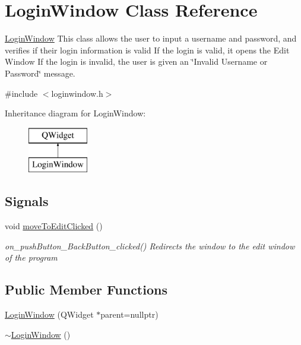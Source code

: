 \hypertarget{class_login_window}{}\section{Login\+Window Class Reference}
\label{class_login_window}


\mbox{\hyperlink{class_login_window}{Login\+Window}} This class allows the user to input a username and password, and verifies if their login information is valid If the login is valid, it opens the Edit Window If the login is invalid, the user is given an \char`\"{}\+Invalid Username or Password\char`\"{} message.  




{\ttfamily \#include $<$loginwindow.\+h$>$}

Inheritance diagram for Login\+Window\+:\begin{figure}[H]
\begin{center}
\leavevmode
\includegraphics[height=2.000000cm]{class_login_window}
\end{center}
\end{figure}
\subsection*{Signals}
\begin{DoxyCompactItemize}
\item 
void \mbox{\hyperlink{class_login_window_a0ed797ae07a4afea038499d6929047a1}{move\+To\+Edit\+Clicked}} ()
\begin{DoxyCompactList}\small\item\em on\+\_\+push\+Button\+\_\+\+Back\+Button\+\_\+clicked() Redirects the window to the edit window of the program \end{DoxyCompactList}\end{DoxyCompactItemize}
\subsection*{Public Member Functions}
\begin{DoxyCompactItemize}
\item 
\mbox{\hyperlink{class_login_window_aa4c04d26b299de00156bbf3c32b2a082}{Login\+Window}} (Q\+Widget $\ast$parent=nullptr)
\item 
\mbox{\hyperlink{class_login_window_a0c49fe788dcce29aa50e7d974e1ad158}{$\sim$\+Login\+Window}} ()
\end{DoxyCompactItemize}



